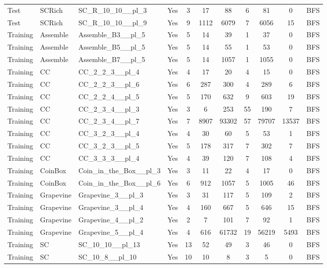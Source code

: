 \documentclass{article}
\begin{document}
\begin{tabular}{lllcccccccc}
Test & SCRich & SC\_R\_10\_10\_\_pl\_3 & Yes & 3 & 17 & 88 & 6 & 81 & 0 & BFS \\
Test & SCRich & SC\_R\_10\_10\_\_pl\_9 & Yes & 9 & 1112 & 6079 & 7 & 6056 & 15 & BFS \\
Training & Assemble & Assemble\_B3\_\_pl\_5 & Yes & 5 & 14 & 39 & 1 & 37 & 0 & BFS \\
Training & Assemble & Assemble\_B5\_\_pl\_5 & Yes & 5 & 14 & 55 & 1 & 53 & 0 & BFS \\
Training & Assemble & Assemble\_B7\_\_pl\_5 & Yes & 5 & 14 & 1057 & 1 & 1055 & 0 & BFS \\
Training & CC & CC\_2\_2\_3\_\_pl\_4 & Yes & 4 & 17 & 20 & 4 & 15 & 0 & BFS \\
Training & CC & CC\_2\_2\_3\_\_pl\_6 & Yes & 6 & 287 & 300 & 4 & 289 & 6 & BFS \\
Training & CC & CC\_2\_2\_4\_\_pl\_5 & Yes & 5 & 170 & 632 & 9 & 603 & 19 & BFS \\
Training & CC & CC\_2\_3\_4\_\_pl\_3 & Yes & 3 & 6 & 253 & 55 & 190 & 7 & BFS \\
Training & CC & CC\_2\_3\_4\_\_pl\_7 & Yes & 7 & 8907 & 93302 & 57 & 79707 & 13537 & BFS \\
Training & CC & CC\_3\_2\_3\_\_pl\_4 & Yes & 4 & 30 & 60 & 5 & 53 & 1 & BFS \\
Training & CC & CC\_3\_2\_3\_\_pl\_5 & Yes & 5 & 178 & 317 & 7 & 302 & 7 & BFS \\
Training & CC & CC\_3\_3\_3\_\_pl\_4 & Yes & 4 & 39 & 120 & 7 & 108 & 4 & BFS \\
Training & CoinBox & Coin\_in\_the\_Box\_\_pl\_3 & Yes & 3 & 11 & 22 & 4 & 17 & 0 & BFS \\
Training & CoinBox & Coin\_in\_the\_Box\_\_pl\_6 & Yes & 6 & 912 & 1057 & 5 & 1005 & 46 & BFS \\
Training & Grapevine & Grapevine\_3\_\_pl\_3 & Yes & 3 & 31 & 117 & 5 & 109 & 2 & BFS \\
Training & Grapevine & Grapevine\_3\_\_pl\_4 & Yes & 4 & 160 & 667 & 5 & 646 & 15 & BFS \\
Training & Grapevine & Grapevine\_4\_\_pl\_2 & Yes & 2 & 7 & 101 & 7 & 92 & 1 & BFS \\
Training & Grapevine & Grapevine\_5\_\_pl\_4 & Yes & 4 & 616 & 61732 & 19 & 56219 & 5493 & BFS \\
Training & SC & SC\_10\_10\_\_pl\_13 & Yes & 13 & 52 & 49 & 3 & 46 & 0 & BFS \\
Training & SC & SC\_10\_8\_\_pl\_10 & Yes & 10 & 10 & 8 & 3 & 5 & 0 & BFS \\

\end{tabular}
\end{document}
